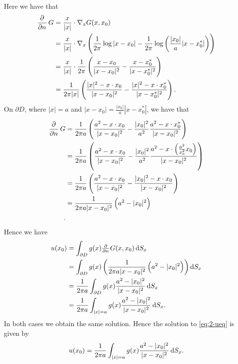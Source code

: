 \documentclass{article}
\begin{document}
Here we have that
%
\begin{align*}
    \dpd{}{n} G
        &= \frac{x}{|x|} \cdot \nabla_x G(x, x_0) \\
        &= \frac{x}{|x|} \cdot \nabla_x \del{\frac{1}{2 \pi} \log |x - x_0| - \frac{1}{2 \pi} \log \del{\frac{|x_0|}{a} |x - x_0^*|}} \\
        &= \frac{x}{|x|} \cdot \frac{1}{2 \pi} \del{\frac{x - x_0}{|x - x_0|^2} - \frac{x - x_0^*}{|x - x_0^*|^2}} \\
        &= \frac{1}{2 \pi |x|} \del{\frac{|x|^2 - x \cdot x_0}{|x - x_0|^2} - \frac{|x|^2 - x \cdot x_0^*}{|x - x_0^*|^2}}
        .
\end{align*}
%
On $\partial D$, where $|x| = a$ and $|x - x_0| = \frac{|x_0|}{a} |x - x_0^*|$, we have that
%
\begin{align*}
    \dpd{}{n} G
        &= \frac{1}{2 \pi a} \del{\frac{a^2 - x \cdot x_0}{|x - x_0|^2} - \frac{|x_0|^2}{a^2} \frac{a^2 - x \cdot x_0^*}{|x - x_0|^2}} \\
        &= \frac{1}{2 \pi a} \del{\frac{a^2 - x \cdot x_0}{|x - x_0|^2} - \frac{|x_0|^2}{a^2} \frac{a^2 - x \cdot \del{\frac{a^2}{x_0^2} x_0}}{|x - x_0|^2}} \\
        &= \frac{1}{2 \pi a} \del{\frac{a^2 - x \cdot x_0}{|x - x_0|^2} - \frac{|x_0|^2 - x \cdot x_0}{|x - x_0|^2}} \\
        &= \frac{1}{2 \pi a |x - x_0|^2} \del{a^2 - |x_0|^2} \\
        .
\end{align*}
%
Hence we have
%
\begin{align*}
    u(x_0)
        &= \int_{\partial D} g(x) \pd{}{n} G(x, x_0) \dif S_x \\
        &= \int_{\partial D} g(x) \del{\frac{1}{2 \pi a |x - x_0|^2} \del{a^2 - |x_0|^2}} \dif S_x \\
        &= \frac{1}{2 \pi a} \int_{\partial D} g(x) \frac{a^2 - |x_0|^2}{|x - x_0|^2} \dif S_x \\
        &= \frac{1}{2 \pi a} \int_{|x| = a} g(x) \frac{a^2 - |x_0|^2}{|x - x_0|^2} \dif S_x
        .
\end{align*}
%
In both cases we obtain the same solution. Hence the solution to \eqref{eq:2-ueq} is given by
%
\begin{equation*}
    u(x_0) = \frac{1}{2 \pi a} \int_{|x| = a} g(x) \frac{a^2 - |x_0|^2}{|x - x_0|^2} \dif S_x
    .
\end{equation*}

\newpage
\end{document}
